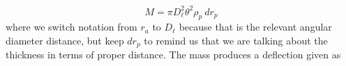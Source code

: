 \begin{equation}
  M = \pi D_\ell^2 \theta^2 \rho_p\ dr_p
\end{equation}
where we switch notation from $r_a$ to $D_\ell$ because that is the relevant angular diameter distance, but keep $dr_p$ to remind us that we are talking about the thickness in terms of proper distance.  The mass produces a deflection given as
  
  